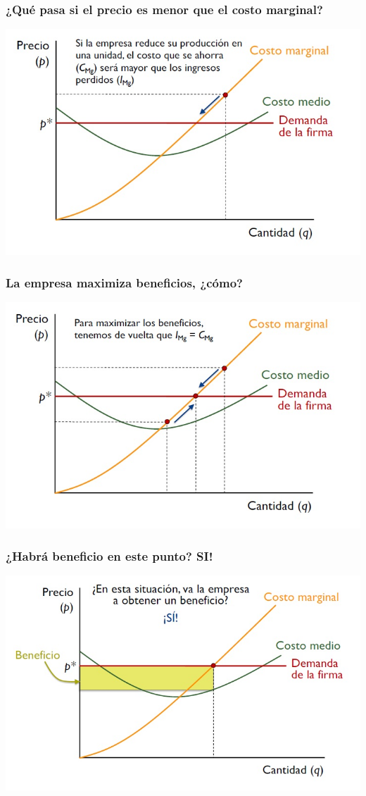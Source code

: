 \documentclass{beamer}
\begin{document}
\begin{frame}
\frametitle{ ¿Qué pasa si el precio es menor que el costo marginal?}
\includegraphics[scale=0.55]{Figures/Tema_07.9_compperfecta3.jpg}
\end{frame}

\begin{frame}
\frametitle{La empresa maximiza beneficios, ¿cómo?}
\includegraphics[scale=0.55]{Figures/Tema_07.10_compperfecta4.jpg}
\end{frame}

\begin{frame}
\frametitle{ ¿Habrá beneficio en este punto? SI!}
\includegraphics[scale=0.55]{Figures/Tema_07.11_compperfecta5.jpg}
\end{frame}
\end{document}
